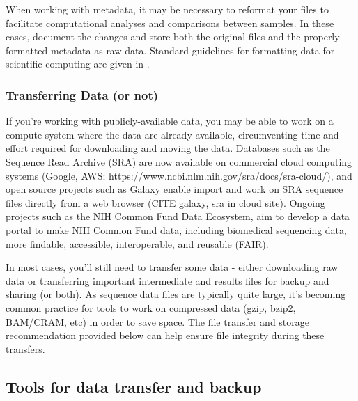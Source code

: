 \documentclass[10pt,letterpaper]{article}
\begin{document}
When working with metadata, it may be necessary to reformat your files to facilitate computational analyses and comparisons between samples. In these cases, document the changes and store both the original files and the properly-formatted metadata as raw data. Standard guidelines for formatting data for scientific computing are given in \cite{wilson2017good}.


\subsubsection*{Transferring Data (or not)} 

If you’re working with publicly-available data, you may be able to work on a compute system where the data are already available, circumventing time and effort required for downloading and moving the data.
Databases such as the Sequence Read Archive (SRA) are now available on commercial cloud computing systems (Google, AWS; https://www.ncbi.nlm.nih.gov/sra/docs/sra-cloud/), and open source projects such as Galaxy enable import and work on SRA sequence files directly from a web browser (CITE galaxy, sra in cloud site). Ongoing projects such as the NIH Common Fund Data Ecosystem, aim to develop a data portal to make NIH Common Fund data, including biomedical sequencing data, more findable,
accessible, interoperable, and reusable (FAIR). 

In most cases, you'll still need to transfer some data - either downloading raw data or transferring important intermediate and results files for backup and sharing (or both). 
As sequence data files are typically quite large, it's becoming common practice for tools to work on compressed data (gzip, bzip2, BAM/CRAM, etc) in order to save space. 
The file transfer and storage recommendation provided below can help ensure file integrity during these transfers.


\subsection*{Tools for data transfer and backup} %
\end{document}
